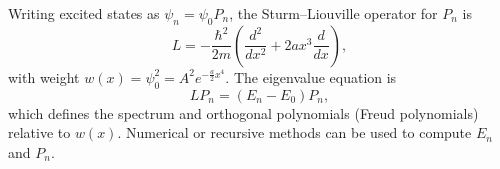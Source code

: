 Writing excited states as $\psi_n = \psi_0 P_n$, the Sturm--Liouville operator for $P_n$ is
\begin{equation}
L = -\frac{\hbar^2}{2m} \left( \frac{d^2}{dx^2} + 2 a x^3 \frac{d}{dx} \right),
\end{equation}
with weight $w(x) = \psi_0^2 = A^2 e^{- \frac{a}{2} x^4}$. The eigenvalue equation is
\begin{equation}
L P_n = (E_n - E_0) P_n,
\end{equation}
which defines the spectrum and orthogonal polynomials (Freud polynomials) relative to $w(x)$.
Numerical or recursive methods can be used to compute $E_n$ and $P_n$.

